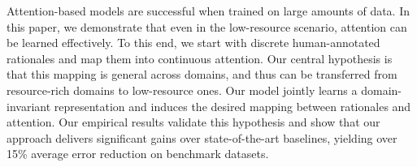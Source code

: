 Attention-based models are successful when trained on large amounts of data. In this paper, we demonstrate that even in the low-resource scenario, attention can be learned effectively. To this end, we start with discrete human-annotated rationales and map them into continuous attention. Our central hypothesis is that this mapping is general across domains,  and thus can be transferred from resource-rich domains to low-resource ones. Our model jointly learns a domain-invariant representation and induces the desired mapping between rationales and attention. Our empirical results validate this hypothesis and show that our approach delivers significant gains over state-of-the-art baselines, yielding over 15\% average error reduction on benchmark datasets.
